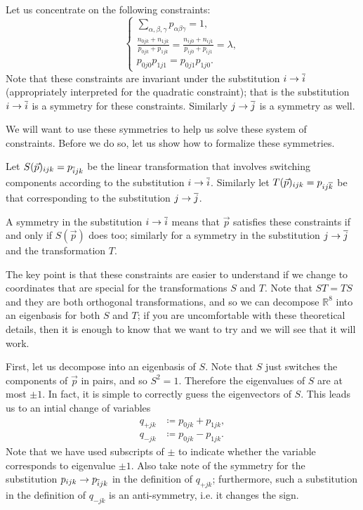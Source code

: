 Let us concentrate on the following constraints:
\begin{equation}
\begin{cases}
\sum_{\alpha, \beta, \gamma} p_{\alpha\beta\gamma} = 1, \\
\frac{n_{0jk} + n_{1jk}} {p_{0jk} + p_{1jk}} = 
    \frac{n_{ij0} + n_{ij1}} {p_{ij0} + p_{ij1}} =
    \lambda, \\
p_{0j0}p_{1j1} = p_{0j1}p_{1j0}.
\end{cases}
\end{equation}
Note that these constraints are invariant under the substitution \(i \to \overline{i}\) (appropriately interpreted
for the quadratic constraint); that is the substitution \(i \to \overline{i}\) is a symmetry for these constraints. 
Similarly \(j \to \overline{j}\) is a symmetry as well.

We will want to use these symmetries to help us solve these system of constraints. Before we do so, let us
show how to formalize these symmetries.

Let \(S(\vec p)_{ijk} = p_{\overline{i}jk}\) be the linear transformation that involves switching components
according to the substitution \(i \to \overline{i}\). Similarly let \(T(\vec p)_{ijk} = p_{ij\overline{k}}\) be that
corresponding to the substitution \(j \to \overline{j}\). 

A symmetry in the substitution \(i \to \overline{i}\) means that \(\vec p\) satisfies these constraints 
if and only if \(S (\vec p)\) does too; similarly for a symmetry in the substitution \(j \to \overline{j}\) and the
transformation \(T\).

The key point is that these constraints are easier to understand if we change to coordinates that are special
for the transformations \(S\) and \(T\). Note that \(ST = TS\) and they are both orthogonal transformations, 
and so we can decompose \(\mathbb R^8\) into an eigenbasis for both \(S\) and \(T\); if you are uncomfortable with
these theoretical details, then it is enough to know that we want to try and we will see that it will work. 

First, let us decompose into an eigenbasis of \(S\). Note that \(S\) just switches the components of \(\vec p\)
in pairs, and so \(S^2 = 1\). Therefore the eigenvalues of \(S\) are at most \(\pm 1\). In fact, it is 
simple to correctly guess the eigenvectors of \(S\). This leads us to an intial change of variables
\begin{align}
q_{+jk} & \coloneqq p_{0jk} + p_{1jk}, \\
q_{-jk} & \coloneqq p_{0jk} - p_{1jk}.
\end{align}
Note that we have used subscripts of \(\pm\) to indicate whether the variable corresponds to 
eigenvalue \(\pm 1\).
Also take note of the symmetry for the substitution \(p_{ijk} \to p_{\overline{i}jk}\) in the 
definition of \(q_{+jk}\); furthermore, such a substitution in the definition of \(q_{-jk}\) is 
an anti-symmetry, i.e. it changes the sign.

